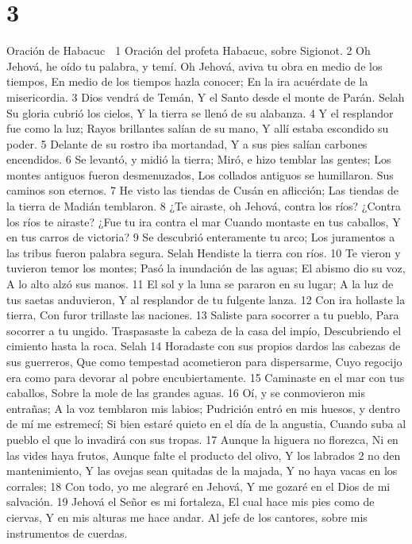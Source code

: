 \chapter{3}

Oración de Habacuc

1 Oración del profeta Habacuc, sobre Sigionot.
2 Oh Jehová, he oído tu palabra, y temí.
Oh Jehová, aviva tu obra en medio de los tiempos,
En medio de los tiempos hazla conocer;
En la ira acuérdate de la misericordia.
3 Dios vendrá de Temán,
Y el Santo desde el monte de Parán. Selah
Su gloria cubrió los cielos,
Y la tierra se llenó de su alabanza.
4 Y el resplandor fue como la luz;
Rayos brillantes salían de su mano,
Y allí estaba escondido su poder.
5 Delante de su rostro iba mortandad,
Y a sus pies salían carbones encendidos.
6 Se levantó, y midió la tierra;
Miró, e hizo temblar las gentes;
Los montes antiguos fueron desmenuzados,
Los collados antiguos se humillaron.
Sus caminos son eternos.
7 He visto las tiendas de Cusán en aflicción;
Las tiendas de la tierra de Madián temblaron.
8 ¿Te airaste, oh Jehová, contra los ríos?
¿Contra los ríos te airaste?
¿Fue tu ira contra el mar
Cuando montaste en tus caballos,
Y en tus carros de victoria?
9 Se descubrió enteramente tu arco;
Los juramentos a las tribus fueron palabra segura. Selah
Hendiste la tierra con ríos.
10 Te vieron y tuvieron temor los montes;
Pasó la inundación de las aguas;
El abismo dio su voz,
A lo alto alzó sus manos.
11 El sol y la luna se pararon en su lugar;
A la luz de tus saetas anduvieron,
Y al resplandor de tu fulgente lanza.
12 Con ira hollaste la tierra,
Con furor trillaste las naciones.
13 Saliste para socorrer a tu pueblo,
Para socorrer a tu ungido.
Traspasaste la cabeza de la casa del impío,
Descubriendo el cimiento hasta la roca. Selah
14 Horadaste con sus propios dardos las cabezas de sus guerreros,
Que como tempestad acometieron para dispersarme,
Cuyo regocijo era como para devorar al pobre encubiertamente.
15 Caminaste en el mar con tus caballos,
Sobre la mole de las grandes aguas.
16 Oí, y se conmovieron mis entrañas;
A la voz temblaron mis labios;
Pudrición entró en mis huesos, y dentro de mí me estremecí; 
Si bien estaré quieto en el día de la angustia,
Cuando suba al pueblo el que lo invadirá con sus tropas.
17 Aunque la higuera no florezca,
Ni en las vides haya frutos,
Aunque falte el producto del olivo,
Y los labrados
2 no den mantenimiento,
Y las ovejas sean quitadas de la majada,
Y no haya vacas en los corrales;
18 Con todo, yo me alegraré en Jehová,
Y me gozaré en el Dios de mi salvación.
19 Jehová el Señor es mi fortaleza,
El cual hace mis pies como de ciervas, 
Y en mis alturas me hace andar. 
Al jefe de los cantores, sobre mis instrumentos de cuerdas.

